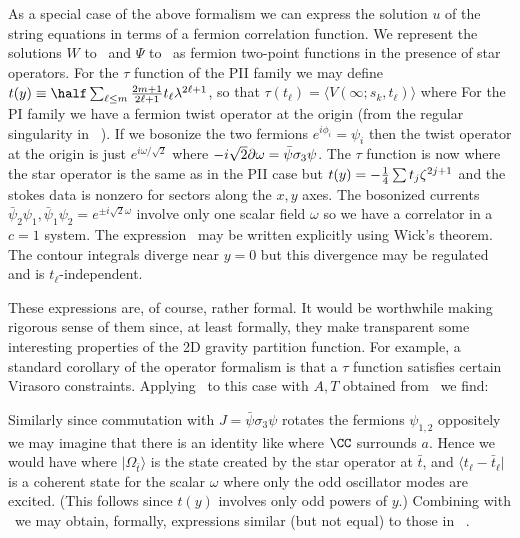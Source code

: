 
As a special case of the above formalism we can express the solution 
$u$ of the string equations in terms of a fermion correlation function. 
We represent the solutions $W$ to \dforz\ and $\Psi$ to \lasaga\ as 
fermion two-point functions in the presence of star operators. For 
the $\tau$ function of the PII family we may define
$t(y)\equiv \half
\sum_{\ell\leq m} {2m+1\over 2\ell +1}t_\ell \lambda^{2\ell+1}$, so that 
$\tau(t_\ell)=\langle V(\infty;s_k,t_\ell)\rangle$ where
\eqn{}
For the PI family we have a fermion twist operator at the origin 
(from the regular singularity in \dforz\ ). If we bosonize the 
two fermions $e^{i\phi_i}=\psi_i$ then the twist 
operator at the origin is just $e^{i\omega/\sqrt{2}}$
where $-i\sqrt{2}\partial\omega=\bar\psi\sigma_3\psi$. The 
$\tau$ function is now 
\eqn{}
where the star operator is the same as in the PII case but 
$t(y)=-{1\over 4}\sum t_j\zeta^{2j+1}$ and the stokes data is 
nonzero for sectors along the $x,y$ axes. 
The bosonized
currents $\bar\psi_2\psi_1,\bar\psi_1\psi_2=e^{\pm i\sqrt{2}\omega}$
involve only one scalar field $\omega$
so we have a correlator
in a $c=1$ system. The expression \srpon\ may be written explicitly
using Wick's theorem. The contour integrals diverge near $y=0$
but this divergence may be regulated and is $t_\ell$-independent.

These expressions are, of course, rather formal. It would be worthwhile
making rigorous sense of them since, at least formally, they make
transparent some interesting properties of the 2D gravity 
partition function. For example, a standard corollary of the operator 
formalism is that a $\tau$ function satisfies certain 
Virasoro constraints. Applying \stress\ to this case
with $A,T$ obtained from \dforz\lasaga\ we find:
\eqn{}

Similarly since commutation with $J=\bar\psi\sigma_3\psi$
rotates the fermions $\psi_{1,2}$ oppositely we may imagine 
that there is an identity like
\eqn{}
where $\CC$ surrounds $a$.
Hence we would have
\eqn{}
where $|\Omega_{\bar t}\rangle$ is the state created by 
the star operator at $\bar t$, and $\langle t_\ell-\bar t_\ell|$
is a coherent state for the scalar $\omega$ where only the 
odd oscillator modes are excited. (This follows since 
$t(y)$ involves only odd powers of $y$.) Combining with 
\vircni\ we may obtain, formally, expressions similar 
(but not equal) to those
in \fukuma\dvv\morozovi\morozovii\ .

